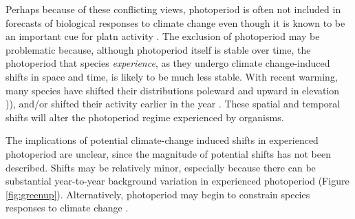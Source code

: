 \documentclass{article}
\begin{document}
\par Perhaps because of these conflicting views, photoperiod is often not included in forecasts of biological responses to climate change even though it is known to be an important cue for platn activity \citet[but see ][]{duputie2015}. %
The exclusion of photoperiod may be problematic because, although photoperiod itself is stable over time, the photoperiod that species \emph{experience}, as they undergo climate change-induced shifts in space and time, is likely to be much less stable. With recent warming, many species have shifted their distributions poleward and upward in elevation \citep[i.e., range shifts][]{parmesan2006,chen2011,harsch2009})), and/or shifted their activity earlier in the year \citep[i.e., phenological shifts][]{parmesan2006, wolkovich2012}. These spatial and temporal shifts will alter the photoperiod regime experienced by organisms. \par The implications of potential climate-change induced shifts in experienced photoperiod are unclear, since the magnitude of potential shifts has not been described. Shifts may be relatively minor, especially because there can be substantial year-to-year background variation in experienced photoperiod (Figure \ref{fig:greenup}). Alternatively, photoperiod may begin to constrain species responses to climate change \citep{koerner2010b}.
\end{document}
